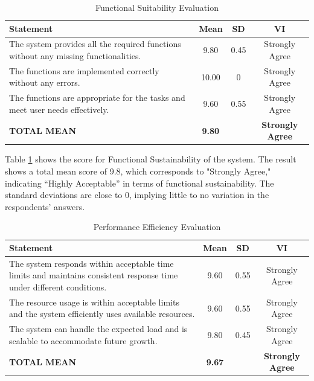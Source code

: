 	\begin{table}[h!]
		\centering
		\caption{Functional Suitability Evaluation}
		\label{funcsus}
		\renewcommand{\arraystretch}{1.2}
		\begin{tabularx}{\linewidth}{|X|c|c|c|}
			\hline
			\textbf{Statement} & \textbf{Mean} & \textbf{SD} & \textbf{VI} \\ \hline
			The system provides all the required functions without any missing functionalities.
			& 9.80 & 0.45 & Strongly Agree \\ \hline
			The functions are implemented correctly without any errors.
			& 10.00 & 0 & Strongly Agree \\ \hline
			The functions are appropriate for the tasks and meet user needs effectively.
			& 9.60 & 0.55 & Strongly Agree \\ \hline
			\textbf{TOTAL MEAN} & \textbf{9.80} & & \textbf{Strongly Agree} \\ \hline
		\end{tabularx}
	\end{table}
	
	
	Table \ref{funcsus} shows the score for Functional Sustainability of the system. The result shows a total mean score of 9.8, which corresponds to "Strongly Agree," indicating “Highly Acceptable” in terms of functional sustainability. The standard deviations are close to 0, implying little to no variation in the respondents’ answers.
	
	\begin{table}[h!]
		\centering
		\caption{Performance Efficiency Evaluation}
		\label{perfeff}
		\renewcommand{\arraystretch}{1.2}
		\begin{tabularx}{\linewidth}{|X|c|c|c|}
			\hline
			\textbf{Statement} & \textbf{Mean} & \textbf{SD} & \textbf{VI} \\ \hline
			The system responds within acceptable time limits and maintains consistent response time under different conditions.
			& 9.60 & 0.55 & Strongly Agree \\ \hline
			The resource usage is within acceptable limits and the system efficiently uses available resources.
			& 9.60 & 0.55 & Strongly Agree \\ \hline
			The system can handle the expected load and is scalable to accommodate future growth.
			& 9.80 & 0.45 & Strongly Agree \\ \hline
			\textbf{TOTAL MEAN} & \textbf{9.67} & & \textbf{Strongly Agree} \\ \hline
		\end{tabularx}
	\end{table}
	
